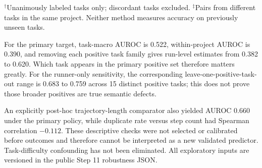 \begin{table}[t]
\caption{Exploratory duplicate-rate robustness under distinct analysis units; not held-out prediction.}
\label{tab:robustness}
\centering
{}
\vspace{1mm}

{\footnotesize $^\dagger$Unanimously labeled tasks only; discordant tasks excluded. $^\ddagger$Pairs from different tasks in the same project. Neither method measures accuracy on previously unseen tasks.}
\end{table}

For the primary target, task-macro AUROC is 0.522, within-project AUROC is 0.390, and removing each positive task family gives run-level estimates from 0.382 to 0.620. Which task appears in the primary positive set therefore matters greatly. For the runner-only sensitivity, the corresponding leave-one-positive-task-out range is 0.683 to 0.759 across 15 distinct positive tasks; this does not prove those broader positives are true semantic defects.

An explicitly post-hoc trajectory-length comparator also yielded AUROC 0.660 under the primary policy, while duplicate rate versus step count had Spearman correlation $-0.112$. These descriptive checks were not selected or calibrated before outcomes and therefore cannot be interpreted as a new validated predictor. Task-difficulty confounding has not been eliminated. All exploratory inputs are versioned in the public Step 11 robustness JSON.
